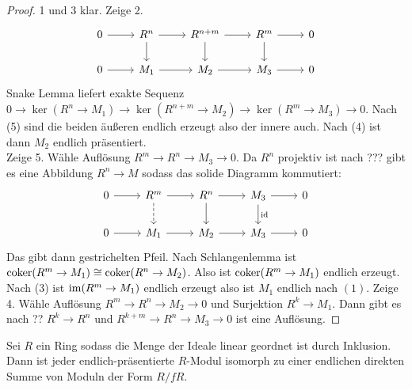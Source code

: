 \begin{proof}
    1 und 3 klar.
    Zeige 2. $$%
\begin{tikzcd}
0 \arrow[r] & R^n \arrow[d] \arrow[r] & R^{n+m} \arrow[d] \arrow[r] & R^m \arrow[d] \arrow[r] & 0 \\
0 \arrow[r] & M_1 \arrow[r]           & M_2 \arrow[r]               & M_3 \arrow[r]           & 0
\end{tikzcd}$$
Snake Lemma liefert exakte Sequenz $0\to \ker(R^n\to M_1)\to \ker(R^{n+m}\to M_2)\to \ker(R^m\to M_3)\to 0$.
Nach (5) sind die beiden äußeren endlich erzeugt also der innere auch. Nach (4) ist dann $M_2$ endlich präsentiert.\\
Zeige 5. Wähle Auflösung $R^m\to R^n\to M_3\to 0$. Da $R^n$ projektiv ist nach ??? gibt es eine Abbildung $R^n\to M$ sodass das solide Diagramm kommutiert:$$%
\begin{tikzcd}
0 \arrow[r] & R^m \arrow[d, dashed] \arrow[r] & R^{n} \arrow[d] \arrow[r] & M_3 \arrow[d, "\id"] \arrow[r] & 0 \\
0 \arrow[r] & M_1 \arrow[r]                   & M_2 \arrow[r]             & M_3 \arrow[r]                  & 0
\end{tikzcd}$$ Das gibt dann gestrichelten Pfeil. Nach Schlangenlemma ist $\operatorname{coker}(R^m\to M_1)\cong \operatorname{coker}(R^n\to M_2)$. Also ist $\operatorname{coker}(R^m\to M_1)$ endlich erzeugt. Nach (3) ist $\operatorname{im}(R^m\to M_1)$ endlich erzeugt also ist $M_1$ endlich nach $(1)$.
Zeige 4. Wähle Auflösung $R^m\to R^n\to M_2\to 0$ und Surjektion $R^k\to M_1$. Dann gibt es nach ?? $R^k\to R^n$ und $R^{k+m}\to R^n\to M_3\to 0$ ist eine Auflösung.
\end{proof}
\begin{Lemma}
    Sei $R$ ein Ring sodass die Menge der Ideale linear geordnet ist durch Inklusion. Dann ist jeder endlich-präsentierte $R$-Modul isomorph zu einer endlichen direkten Summe von Moduln der Form $R/fR$.
\end{Lemma}
